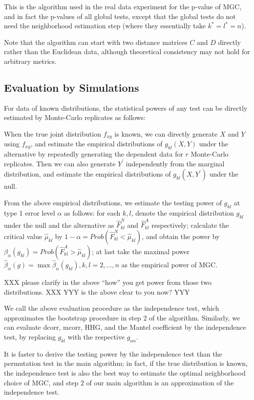 \documentclass[11pt]{article}
\begin{document}
This is the algorithm used in the real data experiment for the p-value of MGC, and in fact the p-values of all global tests, except that the global tests do not need the neighborhood estimation step (where they essentially take $k^{*}=l^{*}=n$).

Note that the algorithm can start with two distance matrices $C$ and $D$ directly rather than the Euclidean data, although theoretical consistency may not hold for arbitrary metrics.

\subsection{Evaluation by Simulations}

For data of known distributions, the statistical powers of any test can be directly estimated by Monte-Carlo replicates as follows:

When the true joint distribution $f_{xy}$ is known, we can directly generate $X$ and $Y$ using $f_{xy}$, and estimate the empirical distributions of $g_{kl}(X,Y)$ under the alternative by repeatedly generating the dependent data for $r$ Monte-Carlo replicates. Then we can also generate $Y^{'}$ independently from the marginal distribution, and estimate the empirical distributions of $g_{kl}(X,Y^{'})$ under the null.

From the above empirical distributions, we estimate the testing power of $g_{kl}$ at type 1 error level $\alpha$ as follows: for each $k,l$, denote the empirical distribution $g_{kl}$ under the null and the alternative as $\hat{F}_{kl}^{N}$ and $\hat{F}_{kl}^A$ respectively; calculate the critical value $\hat{\mu}_{kl}$ by $1-\alpha=Prob(\hat{F}_{kl}^{N}<\hat{\mu}_{kl})$, and obtain the power by $\beta_{\alpha}(g_{kl})=Prob(\hat{F}_{kl}^{A}>\hat{\mu}_{kl})$; at last take the maximal power $\hat{\beta}_{\alpha}(g)=\max{\hat{\beta}_{\alpha}(g_{kl}), k,l=2, \ldots,n}$ as the empirical power of MGC.

XXX please clarify in the above ``how'' you get power from those two distributions. XXX
YYY is the above clear to you now?  YYY

We call the above evaluation procedure as the independence test, which approximates the bootstrap procedure in step 2 of the algorithm. Similarly, we can evaluate dcorr, mcorr, HHG, and the Mantel coefficient by the independence test, by replacing $g_{kl}$ with the respective $g_{nn}$. 

It is faster to derive the testing power by the independence test than the permutation test in the main algorithm; in fact, if the true distribution is known, the independence test is also the best way to estimate the optimal neighborhood choice of MGC, and step $2$ of our main algorithm is an approximation of the independence test. 
\end{document}

